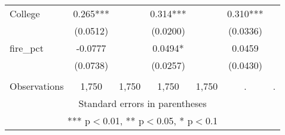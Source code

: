 \begin{tabular}{lcccccc}
College & 0.265*** &  & 0.314*** &  & 0.310*** &  \\
 & (0.0512) &  & (0.0200) &  & (0.0336) &  \\
fire\_pct & -0.0777 &  & 0.0494* &  & 0.0459 &  \\
 & (0.0738) &  & (0.0257) &  & (0.0430) &  \\
 &  &  &  &  &  &  \\
 Observations & 1,750 & 1,750 & 1,750 & 1,750 & . & . \\ \hline
\multicolumn{7}{c}{ Standard errors in parentheses} \\
\multicolumn{7}{c}{ *** p$<$0.01, ** p$<$0.05, * p$<$0.1} \\
\end{tabular}
